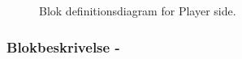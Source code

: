 \documentclass[Arkitektur/System_main.tex]{subfiles}
\begin{document}
\begin{figure}[H]
    \centering
    \caption{Blok definitionsdiagram for Player side.}
    \label{fig:playerside_hardware_bdd}
\end{figure}

\subsubsection{Blokbeskrivelse - } \label{sec:playerside_hardware_block_description}
\end{document}
